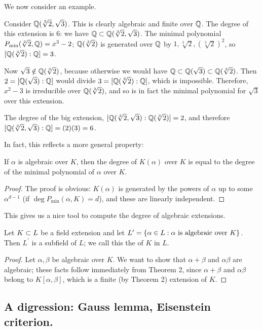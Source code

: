We now consider an example.

\begin{ex}
Consider $\mathbb{Q}(\sqrt[3]{2}, \sqrt{3})$. This is clearly algebraic and finite over $\mathbb{Q}$. The degree of this extension is 6: we have $\mathbb{Q} \subset \mathbb{Q}(\sqrt[3]{2}, \sqrt{3})$. The minimal polynomial $P_{\min}(\sqrt[3]{2}, \mathbb{Q}) = x^3 - 2$; $\mathbb{Q}(\sqrt[3]{2})$ is generated over $\mathbb{Q}$ by $1, \sqrt[3]{2}, (\sqrt[3]{2})^2$, so $[\mathbb{Q}(\sqrt[3]{2}) : \mathbb{Q}] = 3$.

Now $\sqrt{3} \notin \mathbb{Q}(\sqrt[3]{2})$, because otherwise we would have $\mathbb{Q} \subset \mathbb{Q}(\sqrt{3}) \subset \mathbb{Q}(\sqrt[3]{2})$. Then $2 = [\mathbb{Q}(\sqrt{3}):\mathbb{Q}]$ would divide $3 = [\mathbb{Q}(\sqrt[3]{2}):\mathbb{Q}]$, which is impossible. Therefore, $x^2 - 3$ is irreducible over $\mathbb{Q}(\sqrt[3]{2})$, and so is in fact the minimal polynomial for $\sqrt{3}$ over this extension.

The degree of the big extension, $[\mathbb{Q}(\sqrt[3]{2}, \sqrt{3}):\mathbb{Q}(\sqrt[3]{2})] = 2$, and therefore $[\mathbb{Q}(\sqrt[3]{2}, \sqrt{3}):\mathbb{Q}] = (2)(3) = 6$.
\end{ex}
In fact, this reflects a more general property:
\begin{prop}
If $\alpha$ is algebraic over $K$, then the degree of $K(\alpha)$ over $K$ is equal to the degree of the minimal polynomial of $\alpha$ over $K$.
\end{prop}
\begin{proof}
The proof is obvious: $K(\alpha)$ is generated by the powers of $\alpha$ up to some $\alpha^{d-1}$ (if $\deg P_{\min}(\alpha, K) = d$), and these are linearly independent.
\end{proof}

This gives us a nice tool to compute the degree of algebraic extensions.

\begin{prop}
Let $K \subset L$ be a field extension and let $L^\prime = \left\{\alpha \in L : \text{$\alpha$ is algebraic over $K$}\right\}$. Then $L^\prime$ is a subfield of $L$; we call this the  of $K$ in $L$.
\end{prop}
\begin{proof}
Let $\alpha, \beta$ be algebraic over $K$. We want to show that $\alpha + \beta$ and $\alpha\beta$ are algebraic; these facts follow immediately from Theorem 2, since $\alpha + \beta$ and $\alpha\beta$ belong to $K[\alpha, \beta]$, which is a finite (by Theorem 2) extension of $K$.
\end{proof}

\subsection{A digression: Gauss lemma, Eisenstein criterion.}
